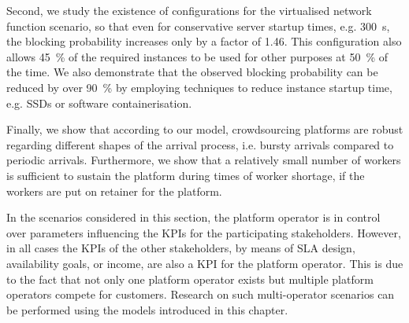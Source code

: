 Second, we study the existence of configurations for the virtualised network function scenario, so that even for conservative server startup times, e.g. \SI{300}{\second}, the blocking probability increases only by a factor of 1.46.
This configuration also allows  \SI{45}{\percent} of the required instances to be used for other purposes at \SI{50}{\percent} of the time.
We also demonstrate that the observed blocking probability can be reduced by over \SI{90}{\percent} by employing techniques to reduce instance startup time, e.g. \glspl{SSD} or software containerisation.

Finally, we show that according to our model, crowdsourcing platforms are robust regarding different shapes of the arrival process, i.e. bursty arrivals compared to periodic arrivals.
Furthermore, we show that a relatively small number of workers is sufficient to sustain the platform during times of worker shortage, if the workers are put on retainer for the platform.

In the scenarios considered in this section, the platform operator is in control over parameters influencing the \glspl{KPI} for the participating stakeholders.
However, in all cases the \glspl{KPI} of the other stakeholders, by means of \gls{SLA} design, availability goals, or income, are also a \gls{KPI} for the platform operator.
This is due to the fact that not only one platform operator exists but multiple platform operators compete for customers.
Research on such multi-operator scenarios can be performed using the models introduced in this chapter.
